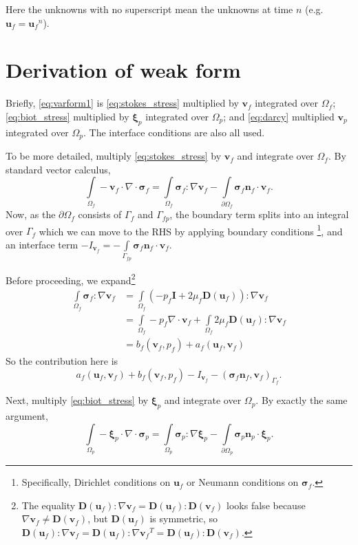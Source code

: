 \documentclass{article}
\newcommand{\mathspace}[1]{\ensuremath{#1}\xspace} %
\newcommand{\D}{\mathspace{\mathbf{D}}}
\newcommand{\sigmabf}{\mathspace{\boldsymbol{\sigma}}}
\newcommand{\grad}{\mathspace{\nabla}}
\renewcommand{\div}{\mathspace{\nabla \cdot}}
\newcommand{\stokes}{\mathspace{\Omega_{f}}}
\newcommand{\stokesbdy}{\mathspace{\Gamma_{f}}}
\newcommand{\darcy}{\mathspace{\Omega_{p}}}
\newcommand{\interface}{\mathspace{\Gamma_{fp}}}
\newcommand{\nf}{\mathspace{\mathbf{n}_f}}
\newcommand{\np}{\mathspace{\mathbf{n}_p}}
\newcommand{\intD}{\mathspace{\int \limits_{\darcy}}}
\newcommand{\intDbdyI}{\mathspace{\int \limits_{\partial \darcy}}}
\newcommand{\intS}{\mathspace{\int \limits_{\stokes}}}
\newcommand{\intSbdyI}{\mathspace{\int \limits_{\partial \stokes}}}
\newcommand{\intI}{\mathspace{\int \limits_{\interface}}}
\newcommand{\uf}{\mathspace{\mathbf{u}_f}}
\newcommand{\vf}{\mathspace{\mathbf{v}_f}}
\newcommand{\vp}{\mathspace{\mathbf{v}_p}}
\newcommand{\pf}{\mathspace{p_f}}
\newcommand{\wf}{\mathspace{w_f}}
\newcommand{\disptest}{\mathspace{\boldsymbol{\xi}_p}}
\begin{document}
Here the unknowns with no superscript mean the unknowns at time $n$ (e.g. $\uf = \uf^n$). 



\section{Derivation of weak form}
Briefly, \eqref{eq:varform1} is \eqref{eq:stokes_stress} multiplied by \vf integrated over \stokes; \eqref{eq:biot_stress} multiplied by \disptest integrated over \darcy; and \eqref{eq:darcy} multiplied \vp integrated over \darcy. The interface conditions are also all used.

To be more detailed, multiply \eqref{eq:stokes_stress} by \vf and integrate over \stokes. By standard vector calculus,
$$\intS - \vf \cdot \div \sigmabf_f = \intS \sigmabf_f \colon \grad \vf - \intSbdyI \sigmabf_f\nf  \cdot \vf.$$
Now, as the $\partial \stokes$ consists of \stokesbdy and \interface, the boundary term splits into an integral over \stokesbdy which we can move to the RHS by applying boundary conditions \footnote{Specifically, Dirichlet conditions on \uf or Neumann conditions on $\sigmabf_f$.}, and an interface term $-I_{\vf} = -\intI \sigmabf_f \nf \cdot \vf$.

Before proceeding, we expand\footnote{The equality $\D(\uf) \colon \grad \vf = \D(\uf) \colon \D(\vf)$ looks false because $\grad \vf \neq \D(\vf)$, but $\D(\uf)$ is symmetric, so $\D(\uf) \colon \grad \vf = \D(\uf) \colon \grad \vf^T = \D(\uf) \colon \D(\vf)$.}
\begin{align*}
  \intS \sigmabf_f \colon \grad \vf &= \intS (-\pf \mathbf{I} + 2 \mu_f \D(\uf)) \colon \grad \vf \\
                                    &= \intS -\pf \div \vf + \intS 2 \mu_f \D(\uf) \colon \grad \vf \\
                                      &= b_f(\vf, \pf) + a_f(\uf, \vf)
\end{align*}
So the contribution here is $$a_f(\uf, \vf) + b_f(\vf, \pf) -I_{\vf} - (\sigmabf_f\nf, \vf)_{\stokesbdy}.$$



Next, multiply \eqref{eq:biot_stress} by \disptest and integrate over \darcy. By exactly the same argument,
$$\intD - \disptest \cdot \div \sigmabf_p = \intD \sigmabf_p \colon \grad \disptest - \intDbdyI \sigmabf_p\np  \cdot \disptest.$$
\end{document}
